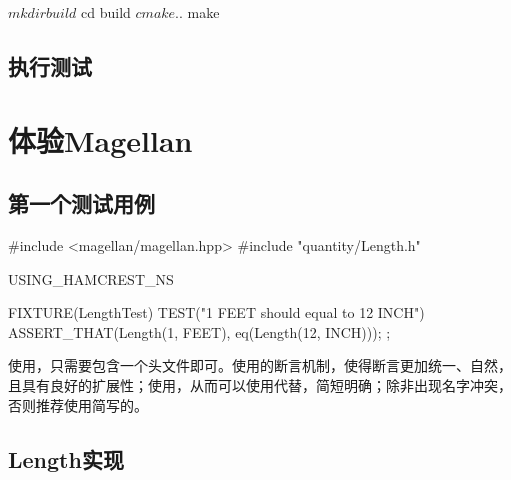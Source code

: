 \begin{content}
\begin{leftbar}
\begin{ruby}[caption={构建Quantity}]
$ mkdir build
$ cd build
$ cmake ..
$ make
\end{ruby}
\end{leftbar}

\subsection{执行测试}


\section{体验Magellan}

\subsection{第一个测试用例}

\begin{leftbar}
\begin{c++}[caption={test/quantity/LengthTest.cpp}]
#include <magellan/magellan.hpp>
#include "quantity/Length.h"

USING_HAMCREST_NS

FIXTURE(LengthTest)
{
    TEST("1 FEET should equal to 12 INCH")
    {
        ASSERT_THAT(Length(1, FEET), eq(Length(12, INCH)));
    }
};
\end{c++}
\end{leftbar}

使用，只需要包含一个头文件即可。使用的断言机制，使得断言更加统一、自然，且具有良好的扩展性；使用，从而可以使用代替，简短明确；除非出现名字冲突，否则推荐使用简写的。

\subsection{Length实现}


\end{content}
